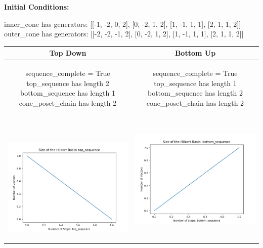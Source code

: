 \documentclass[10pt]{article}
\begin{document}
\textbf{Initial Conditions:}
\begin{SAGE}
inner_cone has generators: 
[[-1, -2, 0, 2], [0, -2, 1, 2], [1, -1, 1, 1], [2, 1, 1, 2]]
outer_cone has generators: 
[[-2, -2, -1, 2], [0, -2, 1, 2], [1, -1, 1, 1], [2, 1, 1, 2]]

\end{SAGE}
\begin{tabular}{c|c}
\textbf{Top Down} & \textbf{Bottom Up} \\ \hline  
\begin{SAGE}
	sequence_complete = True
	top_sequence has length 2
	bottom_sequence has length 1
	cone_poset_chain has length 2
\end{SAGE} 
&
\begin{SAGE}
	sequence_complete = True
	top_sequence has length 1
	bottom_sequence has length 2
	cone_poset_chain has length 2
\end{SAGE} 
\\ \hline
\
\begin{minipage}{.45\textwidth}
\includegraphics[width=\textwidth]{"DATA/4d/4 generators 2 bound I/top_sequence SIZE"}
\end{minipage} &
\begin{minipage}{.45\textwidth}
\includegraphics[width=\textwidth]{"DATA/4d/4 generators 2 bound I bottomup/bottom_sequence SIZE"}

\end{minipage}
\end{tabular}
\end{document}
